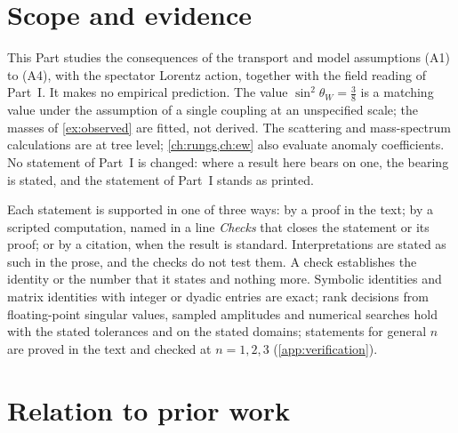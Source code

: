 \section{Scope and evidence}
\label{sec:scope}

This Part studies the consequences of the transport and model assumptions (A1) to (A4), with the spectator Lorentz action, together with
the field reading of Part~I. It makes no empirical prediction. The value $\sin^2\theta_W=\tfrac38$ is a matching value under the assumption
of a single coupling at an unspecified scale; the masses of \cref{ex:observed} are fitted, not derived. The scattering and mass-spectrum
calculations are at tree level; \cref{ch:rungs,ch:ew} also evaluate anomaly coefficients. No statement of Part~I is changed: where a result
here bears on one, the bearing is stated, and the statement of Part~I stands as printed.

Each statement is supported in one of three ways: by a proof in the text; by a scripted computation, named in a line \emph{Checks} that
closes the statement or its proof; or by a citation, when the result is standard. Interpretations are stated as such in the prose, and the
checks do not test them. A check establishes the identity or the number that it states and nothing more. Symbolic identities and matrix
identities with integer or dyadic entries are exact; rank decisions from floating-point singular values, sampled amplitudes and numerical
searches hold with the stated tolerances and on the stated domains; statements for general $n$ are proved in the text and checked at
$n=1,2,3$ (\cref{app:verification}).

\section{Relation to prior work}
\label{sec:prior}

